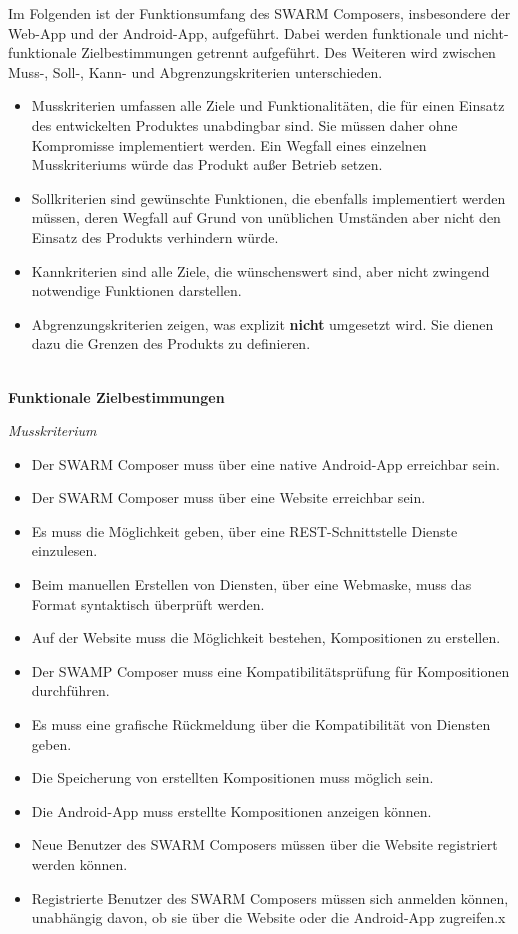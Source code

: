 Im Folgenden ist der Funktionsumfang des SWARM Composers, insbesondere der Web-App und der Android-App, aufgeführt. Dabei werden funktionale und nicht-funktionale Zielbestimmungen getrennt aufgeführt. Des Weiteren wird zwischen Muss-, Soll-, Kann- und Abgrenzungskriterien unterschieden.
%
\begin{itemize}[leftmargin=4pc]
	\item Musskriterien umfassen alle Ziele und Funktionalitäten, die für einen Einsatz des entwickelten Produktes unabdingbar sind.
	Sie müssen daher ohne Kompromisse implementiert werden. Ein Wegfall eines einzelnen Musskriteriums würde das Produkt außer Betrieb setzen.
	\item Sollkriterien sind gewünschte Funktionen, die ebenfalls implementiert werden müssen, deren Wegfall auf Grund von unüblichen Umständen aber nicht den Einsatz des Produkts verhindern würde.
	\item Kannkriterien sind alle Ziele, die wünschenswert sind, aber nicht zwingend notwendige Funktionen darstellen. 
	\item Abgrenzungskriterien zeigen, was explizit \textbf{nicht} umgesetzt wird. Sie dienen dazu die Grenzen des Produkts zu definieren.
	\\\\
\end{itemize}
%

\textbf{Funktionale Zielbestimmungen}\newline
%

\textit{Musskriterium}

\begin{itemize}[leftmargin=4pc]
	\item Der SWARM Composer muss über eine native Android-App erreichbar sein.
	\item Der SWARM Composer muss über eine Website erreichbar sein.
	\item Es muss die Möglichkeit geben, über eine REST-Schnittstelle Dienste einzulesen.
	\item Beim manuellen Erstellen von Diensten, über eine Webmaske, muss das Format syntaktisch überprüft werden.
	\item Auf der Website muss die Möglichkeit bestehen, Kompositionen zu erstellen.
	\item Der SWAMP Composer muss eine Kompatibilitätsprüfung für Kompositionen durchführen.
	\item Es muss eine grafische Rückmeldung über die Kompatibilität von Diensten geben.
	\item Die Speicherung von erstellten Kompositionen muss möglich sein.
	\item Die Android-App muss erstellte Kompositionen anzeigen können.
	\item Neue Benutzer des SWARM Composers müssen über die Website registriert werden können.
	\item Registrierte Benutzer des SWARM Composers müssen sich anmelden können, unabhängig davon, ob sie über die Website oder die Android-App zugreifen.x
\end{itemize}

